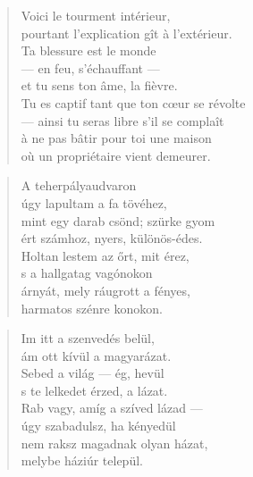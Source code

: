 
\begin{verse}
  Voici le tourment intérieur, \\
  pourtant l'explication gît à l'extérieur. \\
  Ta blessure est le monde \\
  --- en feu, s'échauffant --- \\
  et tu sens ton âme, la fièvre. \\
  Tu es captif tant que ton cœur se révolte \\
  --- ainsi tu seras libre s'il se complaît \\
  à ne pas bâtir pour toi une maison \\
  où un propriétaire vient demeurer.
\end{verse}

\newpage


\vspace*{-15mm}
\centeredornament



\begin{verse}
  A teherpályaudvaron \\
  úgy lapultam a fa tövéhez, \\
  mint egy darab csönd; szürke gyom \\
  ért számhoz, nyers, különös-édes. \\
  Holtan lestem az őrt, mit érez, \\
  s a hallgatag vagónokon \\
  árnyát, mely ráugrott a fényes, \\
  harmatos szénre konokon.
\end{verse}

\bigskip


\begin{verse}
  Im itt a szenvedés belül, \\
  ám ott kívül a magyarázat. \\
  Sebed a világ --- ég, hevül \\
  s te lelkedet érzed, a lázat. \\
  Rab vagy, amíg a szíved lázad --- \\
  úgy szabadulsz, ha kényedül \\
  nem raksz magadnak olyan házat, \\
  melybe háziúr települ.
\end{verse}


